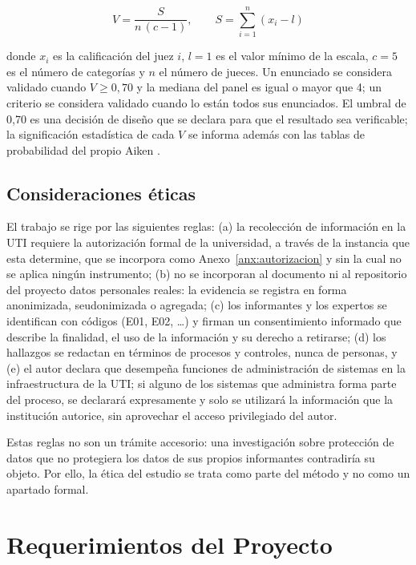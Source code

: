 \begin{equation}
\label{eq:aiken}
V = \frac{S}{n\,(c-1)}, \qquad S = \sum_{i=1}^{n} (x_i - l)
\end{equation}

\noindent donde $x_i$ es la calificación del juez $i$, $l = 1$ es el valor mínimo de la escala, $c = 5$ es el número de categorías y $n$ el número de jueces. Un enunciado se considera validado cuando $V \ge 0{,}70$ y la mediana del panel es igual o mayor que 4; un criterio se considera validado cuando lo están todos sus enunciados. El umbral de 0,70 es una decisión de diseño que se declara para que el resultado sea verificable; la significación estadística de cada $V$ se informa además con las tablas de probabilidad del propio Aiken \cite{aiken1985three}.

\subsection{Consideraciones éticas}

El trabajo se rige por las siguientes reglas: (a) la recolección de información en la UTI requiere la autorización formal de la universidad, a través de la instancia que esta determine, que se incorpora como Anexo~\ref{anx:autorizacion} y sin la cual no se aplica ningún instrumento; (b) no se incorporan al documento ni al repositorio del proyecto datos personales reales: la evidencia se registra en forma anonimizada, seudonimizada o agregada; (c) los informantes y los expertos se identifican con códigos (E01, E02, \ldots) y firman un consentimiento informado que describe la finalidad, el uso de la información y su derecho a retirarse; (d) los hallazgos se redactan en términos de procesos y controles, nunca de personas, y (e) el autor declara que desempeña funciones de administración de sistemas en la infraestructura de la UTI; si alguno de los sistemas que administra forma parte del proceso, se declarará expresamente y solo se utilizará la información que la institución autorice, sin aprovechar el acceso privilegiado del autor.

Estas reglas no son un trámite accesorio: una investigación sobre protección de datos que no protegiera los datos de sus propios informantes contradiría su objeto. Por ello, la ética del estudio se trata como parte del método y no como un apartado formal.

\section{Requerimientos del Proyecto}
\label{sec:requerimientos}

